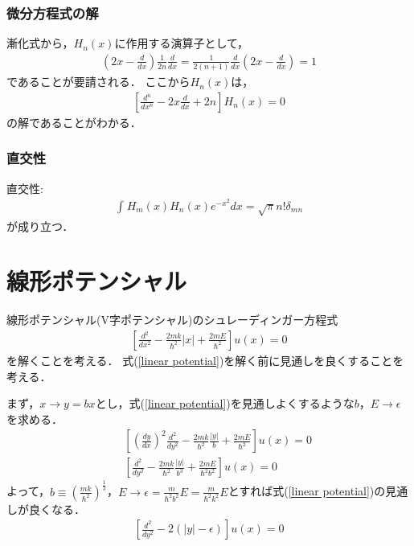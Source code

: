 \documentclass[12pt]{jsarticle}
\numberwithin{equation}{section}
\begin{document}
\subsubsection{微分方程式の解}
漸化式から，$H_n(x)$に作用する演算子として，
\begin{eqnarray}
	\left(2x-\frac{d}{dx}\right) \frac{1}{2n}\frac{d}{dx} = \frac{1}{2(n+1)}\frac{d}{dx}\left(2x-\frac{d}{dx}\right) = 1
\end{eqnarray}
であることが要請される．
ここから$H_n(x)$は，
\begin{eqnarray}
	\left[\frac{d^n}{dx^n} - 2x \frac{d}{dx} + 2n\right] H_n(x) = 0
\end{eqnarray}
の解であることがわかる．

\subsubsection{直交性}
直交性:
\begin{eqnarray}
	\int_{}^{} H_m(x) H_n(x) e^{-x^2} dx = \sqrt{\pi} n! \delta_{mn}
\end{eqnarray}
が成り立つ．

\section{線形ポテンシャル}
線形ポテンシャル(V字ポテンシャル)のシュレーディンガー方程式
\begin{eqnarray}\label{linear potential}
	\left[\frac{d^2}{dx^2} - \frac{2mk}{\hbar^2}|x| + \frac{2mE}{\hbar^2}\right]u(x) = 0
\end{eqnarray}
を解くことを考える．%
式(\ref{linear potential})を解く前に見通しを良くすることを考える．

まず，$x\to y = bx$とし，式(\ref{linear potential})を見通しよくするような$b$，$E\to\epsilon$を求める．
\begin{eqnarray}
	&&\left[\left(\frac{dy}{dx}\right)^2\frac{d^2}{dy^2} - \frac{2mk}{\hbar^2}\frac{|y|}{b} + \frac{2mE}{\hbar^2}\right]u(x) = 0 \nonumber\\
	&&\left[\frac{d^2}{dy^2} - \frac{2mk}{\hbar^2}\frac{|y|}{b^3} + \frac{2mE}{\hbar^2 b^2}\right]u(x) = 0
\end{eqnarray}
よって，$b\equiv\left(\frac{mk}{\hbar^2}\right)^{\frac{1}{3}}$，$E\to\epsilon=\frac{m}{\hbar^2b^2} E = \frac{m}{\hbar^2 k^2} E$とすれば式(\ref{linear potential})の見通しが良くなる．
\begin{eqnarray}\label{linear potential 2}
	\left[\frac{d^2}{dy^2} - 2(|y| - \epsilon)\right]u(x) = 0
\end{eqnarray}
\end{document}
